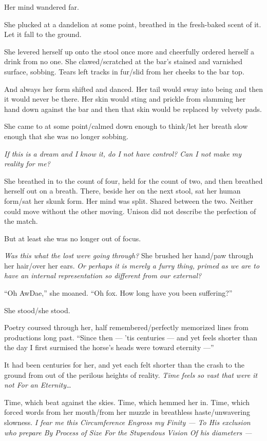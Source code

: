 Her mind wandered far.

She plucked at a dandelion at some point, breathed in the fresh-baked scent of it. Let it fall to the ground.

She levered herself up onto the stool once more and cheerfully ordered herself a drink from no one. She clawed/scratched at the bar's stained and varnished surface, sobbing. Tears left tracks in fur/slid from her cheeks to the bar top.

And always her form shifted and danced. Her tail would sway into being and then it would never be there. Her skin would sting and prickle from slamming her hand down against the bar and then that skin would be replaced by velvety pads.

She came to at some point/calmed down enough to think/let her breath slow enough that she was no longer sobbing.

\emph{If this is a dream and I know it, do I not have control? Can I not make my reality for me?}

She breathed in to the count of four, held for the count of two, and then breathed herself out on a breath. There, beside her on the next stool, sat her human form/sat her skunk form. Her mind was split. Shared between the two. Neither could move without the other moving. Unison did not describe the perfection of the match.

But at least she was no longer out of focus.

\emph{Was this what the lost were going through?} She brushed her hand/paw through her hair/over her ears. \emph{Or perhaps it is merely a furry thing, primed as we are to have an internal representation so different from our external?}

``Oh AwDae,'' she moaned. ``Oh fox. How long have you been suffering?''

She stood/she stood.

Poetry coursed through her, half remembered/perfectly memorized lines from productions long past. ``Since then — 'tis centuries — and yet feels shorter than the day I first surmised the horse's heads were toward eternity —''

It had been centuries for her, and yet each felt shorter than the crash to the ground from out of the perilous heights of reality. \emph{Time feels so vast that were it not For an Eternity\ldots{}}

Time, which beat against the skies. Time, which hemmed her in. Time, which forced words from her mouth/from her muzzle in breathless haste/unwavering slowness. \emph{I fear me this Circumference Engross my Finity — To His exclusion who prepare By Process of Size For the Stupendous Vision Of his diameters —}

